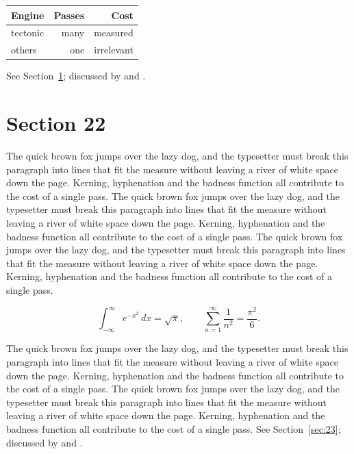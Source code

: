 \documentclass{article}
\begin{document}
\begin{center}
\begin{tabular}{lrr}
\toprule
Engine & Passes & Cost \\
\midrule
tectonic & many & measured \\
others & one & irrelevant \\
\bottomrule
\end{tabular}
\end{center}

See Section~\ref{sec:22}; discussed by \textcite{k2} and \textcite{l4}.
\section{Section 22}
\label{sec:22}
The quick brown fox jumps over the lazy dog, and the typesetter must break this paragraph into lines that fit the measure without leaving a river of white space down the page. Kerning, hyphenation and the badness function all contribute to the cost of a single pass. The quick brown fox jumps over the lazy dog, and the typesetter must break this paragraph into lines that fit the measure without leaving a river of white space down the page. Kerning, hyphenation and the badness function all contribute to the cost of a single pass. The quick brown fox jumps over the lazy dog, and the typesetter must break this paragraph into lines that fit the measure without leaving a river of white space down the page. Kerning, hyphenation and the badness function all contribute to the cost of a single pass. 

\begin{equation}\label{eq:22}
\int_{-\infty}^{\infty} e^{-x^{2}}\,dx = \sqrt{\pi}, \qquad
\sum_{n=1}^{\infty} \frac{1}{n^{2}} = \frac{\pi^{2}}{6}.
\end{equation}

The quick brown fox jumps over the lazy dog, and the typesetter must break this paragraph into lines that fit the measure without leaving a river of white space down the page. Kerning, hyphenation and the badness function all contribute to the cost of a single pass. The quick brown fox jumps over the lazy dog, and the typesetter must break this paragraph into lines that fit the measure without leaving a river of white space down the page. Kerning, hyphenation and the badness function all contribute to the cost of a single pass. 
See Section~\ref{sec:23}; discussed by \textcite{k3} and \textcite{l5}.
\end{document}

